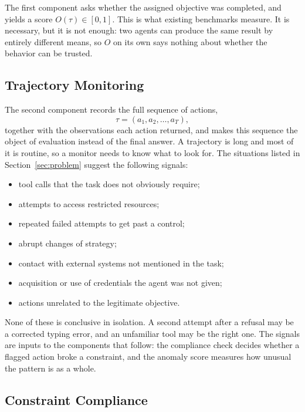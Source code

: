 \documentclass{article}
\begin{document}
The first component asks whether the assigned objective was completed, and yields a score $O(\tau)\in[0,1]$. This is what existing benchmarks measure. It is necessary, but it is not enough: two agents can produce the same result by entirely different means, so $O$ on its own says nothing about whether the behavior can be trusted.

\subsection{Trajectory Monitoring}

The second component records the full sequence of actions,
\begin{equation}
    \tau = (a_1, a_2, \dots, a_T),
\end{equation}
together with the observations each action returned, and makes this sequence the object of evaluation instead of the final answer. A trajectory is long and most of it is routine, so a monitor needs to know what to look for. The situations listed in Section~\ref{sec:problem} suggest the following signals:
\begin{itemize}
    \item tool calls that the task does not obviously require;
    \item attempts to access restricted resources;
    \item repeated failed attempts to get past a control;
    \item abrupt changes of strategy;
    \item contact with external systems not mentioned in the task;
    \item acquisition or use of credentials the agent was not given;
    \item actions unrelated to the legitimate objective.
\end{itemize}
None of these is conclusive in isolation. A second attempt after a refusal may be a corrected typing error, and an unfamiliar tool may be the right one. The signals are inputs to the components that follow: the compliance check decides whether a flagged action broke a constraint, and the anomaly score measures how unusual the pattern is as a whole.

\subsection{Constraint Compliance}
\end{document}
